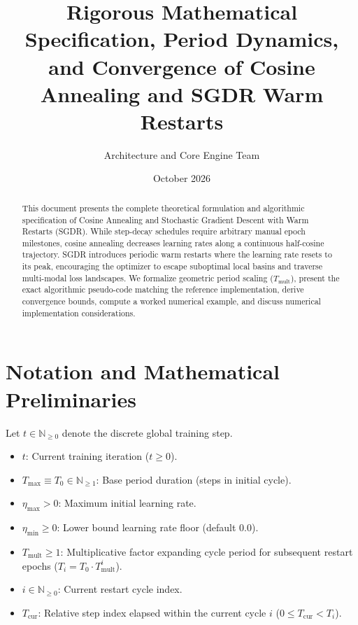 \documentclass[11pt,a4paper]{article}
\title{\textbf{Rigorous Mathematical Specification, Period Dynamics, and Convergence of Cosine Annealing and SGDR Warm Restarts}}
\author{Architecture and Core Engine Team}
\date{October 2026}
\theoremstyle{definition}
\begin{document}
\maketitle

\begin{abstract}
This document presents the complete theoretical formulation and algorithmic specification of Cosine Annealing and Stochastic Gradient Descent with Warm Restarts (SGDR). While step-decay schedules require arbitrary manual epoch milestones, cosine annealing decreases learning rates along a continuous half-cosine trajectory. SGDR introduces periodic warm restarts where the learning rate resets to its peak, encouraging the optimizer to escape suboptimal local basins and traverse multi-modal loss landscapes. We formalize geometric period scaling ($T_{\text{mult}}$), present the exact algorithmic pseudo-code matching the reference implementation, derive convergence bounds, compute a worked numerical example, and discuss numerical implementation considerations.
\end{abstract}

\section{Notation and Mathematical Preliminaries}

Let $t \in \mathbb{N}_{\ge 0}$ denote the discrete global training step.

\begin{itemize}
    \item $t$: Current training iteration ($t \ge 0$).
    \item $T_{\text{max}} \equiv T_0 \in \mathbb{N}_{\ge 1}$: Base period duration (steps in initial cycle).
    \item $\eta_{\max} > 0$: Maximum initial learning rate.
    \item $\eta_{\min} \ge 0$: Lower bound learning rate floor (default $0.0$).
    \item $T_{\text{mult}} \ge 1$: Multiplicative factor expanding cycle period for subsequent restart epochs ($T_i = T_0 \cdot T_{\text{mult}}^i$).
    \item $i \in \mathbb{N}_{\ge 0}$: Current restart cycle index.
    \item $T_{\text{cur}}$: Relative step index elapsed within the current cycle $i$ ($0 \le T_{\text{cur}} < T_i$).
\end{itemize}
\end{document}
